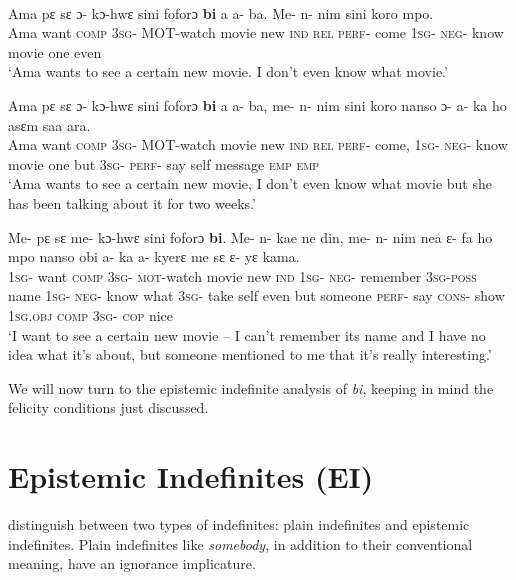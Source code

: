\documentclass[output=paper,modfonts,nonflat,draftmode]{langsci/langscibook}
\begin{document}
\ea
{}\\
\ea\label{owusu:ex20}
\gll Ama pε sε ɔ- kɔ-hwε sini foforɔ \textbf{bi} a a- ba. Me- n- nim sini koro mpo.\\
Ama want \textsc{comp} \textsc{3sg}- \textsc{MOT}-watch movie new \textsc{ind} \textsc{rel} \textsc{perf}- come \textsc{1sg}- \textsc{neg}- know movie one even \\
\glt `Ama wants to see a certain new movie. I don't even know what movie.'

\ex\label{owusu:ex21}
 \gll Ama pε sε ɔ- kɔ-hwε sini foforɔ \textbf{bi} a a- ba, me- n- nim sini koro nanso ɔ- a- ka ho asεm saa ara.\\
Ama want \textsc{comp} \textsc{3sg}- \textsc{MOT}-watch movie new \textsc{ind} \textsc{rel} \textsc{perf}- come, \textsc{1sg}- \textsc{neg}- know movie one but \textsc{3sg}- \textsc{perf}- say self message \textsc{emp} \textsc{emp} \\
\glt `Ama wants to see a certain new movie, I don't even know what movie but she has been talking about it for two weeks.'

\ex\label{owusu:ex20a}
\gll Me- pε sε me- kɔ-hwε sini foforɔ \textbf{bi}. Me- n- kae ne din, me- n- nim nea ε- fa ho mpo nanso obi a- ka a- kyerε me sε ε- yε kama.\\
\textsc{1sg}- want \textsc{comp} \textsc{3sg}- \textsc{mot}-watch movie new \textsc{ind} \textsc{1sg}- \textsc{neg}- remember \textsc{3sg}-\textsc{poss} name \textsc{1sg}- \textsc{neg}- know what \textsc{3sg}- take self even but someone \textsc{perf}- say \textsc{cons}- show \textsc{1sg}.\textsc{obj} \textsc{comp} \textsc{3sg}- \textsc{cop} nice\\
\glt `I want to see a certain new movie – I can’t remember its name and I have no idea what it’s about, but someone mentioned to me that it’s really interesting.'
\z\z

We will now turn to the epistemic indefinite analysis of \emph{bi}, keeping in mind the felicity conditions just discussed.

\section{Epistemic Indefinites (EI)}\label{sec:owusu:3}

\citet{AloniPort2015} distinguish between two types of indefinites: plain indefinites and epistemic indefinites. Plain indefinites like \emph{somebody}, in addition to their conventional meaning, have an ignorance implicature.
\end{document}

